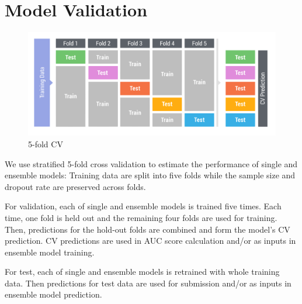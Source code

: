 \section{Model Validation}

\begin{figure}[!ht]
  \caption{5-fold CV}
  \centering
    \includegraphics[width=0.5 \textwidth]{cv}
\end{figure}


We use stratified 5-fold cross validation to estimate the performance of single and ensemble models:
Training data are split into five folds while the sample size and dropout rate are preserved across folds.

For validation, each of single and ensemble models is trained five times. Each time, one fold is held out and the remaining four folds are used for training. Then, predictions for the hold-out folds are combined and form the model's CV prediction. CV predictions are used in AUC score calculation and/or as inputs in ensemble model training.

For test, each of single and ensemble models is retrained with whole training data. Then predictions for test data are used for submission and/or as inputs in ensemble model prediction.

